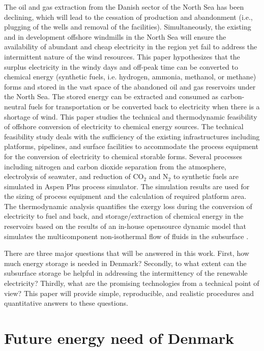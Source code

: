 \documentclass{ECOS_2021}
\begin{document}
The oil and gas extraction from the Danish sector of the North Sea
has been declining, which will lead to the cessation of production
and abandonment (i.e., plugging of the wells and removal of the facilities).
Simultaneously, the existing and in development offshore windmills
in the North Sea will ensure the availability of abundant and cheap
electricity in the region yet fail to address the intermittent nature
of the wind resources. This paper hypothesizes that the surplus electricity
in the windy days and off-peak time can be converted to chemical energy
(synthetic fuels, i.e. hydrogen, ammonia, methanol, or methane) forms
and stored in the vast space of the abandoned oil and gas reservoirs
under the North Sea. The stored energy can be extracted and consumed
as carbon-neutral fuels for transportation or be converted back to
electricity when there is a shortage of wind. This paper studies the
technical and thermodynamic feasibility of offshore conversion of
electricity to chemical energy sources. The technical feasibility
study deals with the sufficiency of the existing infrastructures including
platforms, pipelines, and surface facilities to accommodate the process
equipment for the conversion of electricity to chemical storable forms.
Several processes including nitrogen and carbon dioxide separation
from the atmosphere, electrolysis of seawater, and reduction of CO$_{2}$
and N$_{2}$ to synthetic fuels are simulated in Aspen Plus process
simulator. The simulation results are used for the sizing of process
equipment and the calculation of required platform area. The thermodynamic
analysis quantifies the exergy loss during the conversion of electricity
to fuel and back, and storage/extraction of chemical energy in the
reservoirs based on the results of an in-house opensource dynamic
model that simulates the multicomponent non-isothermal flow of fluids
in the subsurface \cite{eftekhariFVToolFiniteVolume2015b}.

There are three major questions that will be answered in this work.
First, how much energy storage is needed in Denmark? Secondly, to
what extent can the subsurface storage be helpful in addressing the
intermittency of the renewable electricity? Thirdly, what are the
promising technologies from a technical point of view? This paper
will provide simple, reproducible, and realistic procedures and quantitative
answers to these questions.

\sffamily \Large \section{Future energy need of Denmark}
\rmfamily \normalsize
\end{document}
